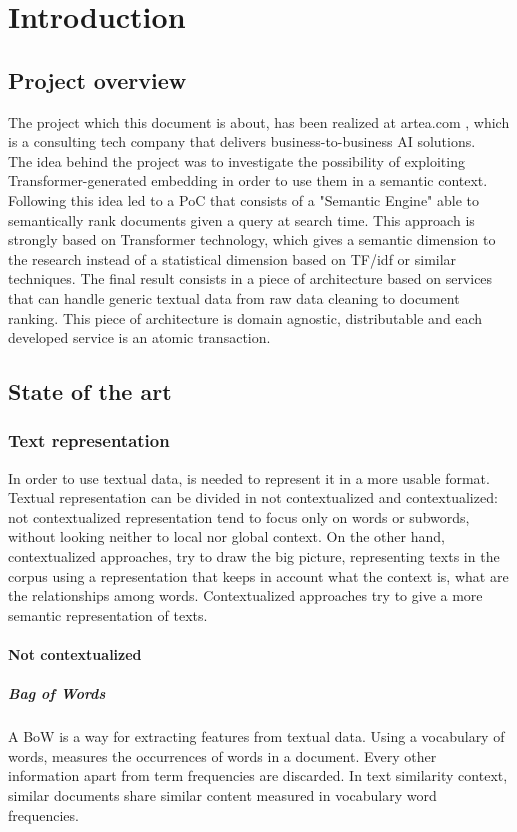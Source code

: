 \documentclass[\main/main.tex]{subfiles}
\begin{document}
\chapter{Introduction}
\section{Project overview}
The project which this document is about, has been realized at artea.com \cite{artea}, which is a consulting tech company that delivers business-to-business AI solutions. \\
The idea behind the project was to investigate the possibility of exploiting Transformer-generated embedding in order to use them in a semantic context. Following this idea led to a PoC that consists of a "Semantic Engine" able to semantically rank documents given a query at search time. This approach is strongly based on Transformer technology, which gives a semantic dimension to the research instead of a statistical dimension based on TF/idf or similar techniques.
The final result consists in a piece of architecture based on services that can handle generic textual data from raw data cleaning to document ranking. This piece of architecture is domain agnostic, distributable and each developed service is an atomic transaction.
\section{State of the art}
\subsection{Text representation}
In order to use textual data, is needed to represent it in a more usable format. Textual representation can be divided in not contextualized and contextualized: not contextualized representation tend to focus only on words or subwords, without looking neither to local nor global context. On the other hand, contextualized approaches, try to draw the big picture, representing texts in the corpus using a representation that keeps in account what the context is, what are the relationships among words. Contextualized approaches try to give a more semantic representation of texts.
\subsubsection{Not contextualized}
\paragraph{Bag of Words}
A BoW is a way for extracting features from textual data. Using a vocabulary of words, measures the occurrences of words in a document. Every other information apart from term frequencies are discarded. In text similarity context, similar documents share similar content measured in vocabulary word frequencies.
\end{document}
